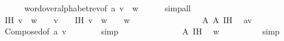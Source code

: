 \begin{isabellebody}
\ \ \ \ \isamarkupfalse%
\ word{\isacharunderscore}{\kern0pt}over{\isacharunderscore}{\kern0pt}alphabet{\isacharunderscore}{\kern0pt}rev{\isacharbrackleft}{\kern0pt}of\ a\ {\isachardoublequoteopen}v\ {\isasymcdot}\ w{\isachardoublequoteclose}{\isacharbrackright}{\kern0pt}\isanewline
\ \ \ \ \isamarkupfalse%
\ simp{\isacharunderscore}{\kern0pt}all\isanewline
\ \ \isamarkupfalse%
\ IH{}{\isacharcolon}{\kern0pt}\ {\isachardoublequoteopen}v\ {\isasymcdot}\ w\ {\isasymin}\ {\isasymSigma}\isactrlsup {\isacharasterisk}{\kern0pt}\ {\isasymLongrightarrow}\ v\ {\isasymin}\ {\isasymSigma}\isactrlsup {\isacharasterisk}{\kern0pt}{\isachardoublequoteclose}\ \ IH{}{\isacharcolon}{\kern0pt}\ {\isachardoublequoteopen}v\ {\isasymcdot}\ w\ {\isasymin}\ {\isasymSigma}\isactrlsup {\isacharasterisk}{\kern0pt}\ {\isasymLongrightarrow}\ w\ {\isasymin}\ {\isasymSigma}\isactrlsup {\isacharasterisk}{\kern0pt}{\isachardoublequoteclose}\isanewline
\ \ \isakeywordONE{{\isacharbraceleft}{\kern0pt}}\isamarkupfalse%
\isanewline
\ \ \ \ \isamarkupfalse%
\ {}\isanewline
\ \ \ \ \isamarkupfalse%
\ A{}\ A{}\ IH{}\ \isamarkupfalse%
\ {\isachardoublequoteopen}a{\isacharhash}{\kern0pt}v\ {\isasymin}\ {\isasymSigma}\isactrlsup {\isacharasterisk}{\kern0pt}{\isachardoublequoteclose}\isanewline
\ \ \ \ \ \ \isamarkupfalse%
\ Composed{\isacharbrackleft}{\kern0pt}of\ a\ v{\isacharbrackright}{\kern0pt}\isanewline
\ \ \ \ \ \ \isamarkupfalse%
\ simp\isanewline
\ \ \isamarkupfalse%
\isanewline
\ \ \ \ \isamarkupfalse%
\ {}\isanewline
\ \ \ \ \isamarkupfalse%
\ A{}\ IH{}\ \isamarkupfalse%
\ {\isachardoublequoteopen}w\ {\isasymin}\ {\isasymSigma}\isactrlsup {\isacharasterisk}{\kern0pt}{\isachardoublequoteclose}\isanewline
\ \ \ \ \ \ \isamarkupfalse%
\ simp\isanewline
\ \ \isakeywordONE{{\isacharbraceright}{\kern0pt}}\isamarkupfalse%
\isanewline
{}\isamarkupfalse%
%
\endisatagproof
{\isafoldproof}%
%
\isadelimproof
\isanewline
%
\endisadelimproof
\isanewline
{}\isamarkupfalse%
\isanewline
%
\isadelimtheory
\isanewline
%
\endisadelimtheory
%
\isatagtheory
{}\isamarkupfalse%
%
\endisatagtheory
{\isafoldtheory}%
%
\isadelimtheory
%
\endisadelimtheory
%
\end{isabellebody}%
